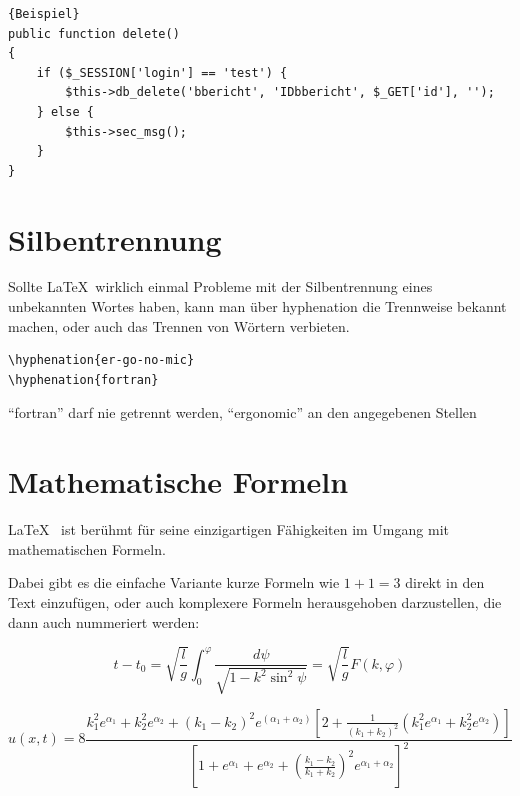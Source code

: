 \begin{lstlisting}[caption=Dies ist ein PHP Beispiel]{Beispiel}
public function delete()
{
    if ($_SESSION['login'] == 'test') {
        $this->db_delete('bbericht', 'IDbbericht', $_GET['id'], '');
    } else {
        $this->sec_msg();
    }
}
\end{lstlisting}    %


\section{Silbentrennung}

Sollte \LaTeX~wirklich einmal Probleme mit der Silbentrennung eines unbekannten Wortes haben, kann man über hyphenation
die Trennweise bekannt machen, oder auch das Trennen von Wörtern verbieten.
\begin{verbatim}
\hyphenation{er-go-no-mic}
\hyphenation{fortran}
\end{verbatim}
 "`fortran"' darf nie getrennt werden, "`ergonomic"' an den angegebenen Stellen


\section{Mathematische Formeln}

\LaTeX~ ist berühmt für seine einzigartigen Fähigkeiten im Umgang mit mathematischen Formeln.

Dabei gibt es die einfache Variante kurze Formeln wie $1+1=3$ direkt in den Text einzufügen, oder auch komplexere Formeln herausgehoben darzustellen, die dann auch nummeriert werden:

\begin{equation}%
t-t_{0}=\sqrt{\frac{l}{g}}\int_{0}^{\varphi}{\frac{d\psi}{\sqrt{1-k^{2}\sin^{2} {\psi}}}} = \sqrt{\frac{l}{g}} F(k,\varphi)
\end{equation}%

\begin{equation}%
u(x,t)= 8 \frac{k_{1}^{2}e^{\alpha_{1}} + k_{2}^{2}e^{\alpha_{2}} + (k_{1}-k_{2})^{2}e^{(\alpha_{1}+ \alpha_{2})} \left[2 + \frac{1}{(k_{1} + k_{2})^{2}} ( k_{1}^{2}e^{\alpha_{1}} + k_{2}^{2}e^{\alpha_{2}}) \right]}{\left[1+e^{\alpha_{1}} + e^{\alpha_{2}} + \left(\frac{k_{1} - k_{2}}{k_{1}+k_{2}} \right)^{2} e^{\alpha_{1}+ \alpha_{2}} \right]^{2}}
\end{equation}%


